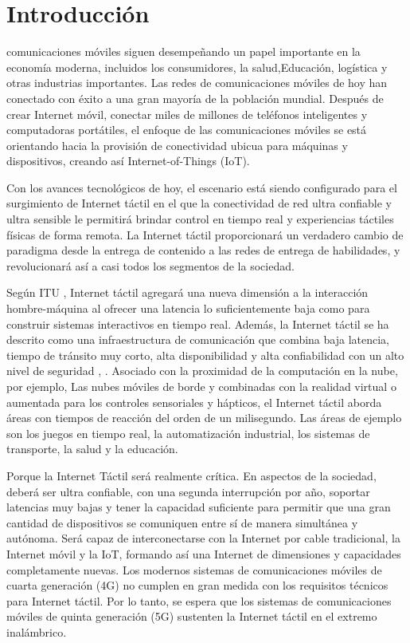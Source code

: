 \documentclass[12pt,journal,compsoc]{IEEEtran}
\begin{document}
\section{Introducción}

 comunicaciones móviles siguen desempeñando un papel importante en la economía moderna, incluidos los consumidores, la salud,Educación, logística y otras industrias importantes. Las redes de comunicaciones móviles de hoy han conectado con éxito a una gran mayoría de la población mundial. Después de crear Internet móvil, conectar miles de millones de teléfonos inteligentes y computadoras portátiles, el enfoque de las comunicaciones móviles se está orientando hacia la provisión de conectividad ubicua para máquinas y dispositivos, creando así Internet-of-Things (IoT).\cite{1}

Con los avances tecnológicos de hoy, el escenario está siendo configurado para el surgimiento de Internet táctil en el que la conectividad de red ultra confiable y ultra sensible le permitirá brindar control en tiempo real y experiencias táctiles físicas de forma remota. La Internet táctil proporcionará un verdadero cambio de paradigma desde la entrega de contenido a las redes de entrega de habilidades, y revolucionará así a casi todos los segmentos de la sociedad. 

Según ITU \cite{2}, Internet táctil agregará una nueva dimensión a la interacción hombre-máquina al ofrecer una latencia lo suficientemente baja como para construir sistemas interactivos en tiempo real. Además, la Internet táctil se ha descrito como una infraestructura de comunicación que combina baja latencia, tiempo de tránsito muy corto, alta disponibilidad y alta confiabilidad con un alto nivel de seguridad \cite{3}, \cite{4}. Asociado con la proximidad de la computación en la nube, por ejemplo, Las nubes móviles de borde y combinadas con la realidad virtual o aumentada para los controles sensoriales y hápticos, el Internet táctil aborda áreas con tiempos de reacción del orden de un milisegundo. Las áreas de ejemplo son los juegos en tiempo real, la automatización industrial, los sistemas de transporte, la salud y la educación.

Porque la Internet Táctil será realmente crítica. En aspectos de la sociedad, deberá ser ultra confiable, con una segunda interrupción por año, soportar latencias muy bajas y tener la capacidad suficiente para permitir que una gran cantidad de dispositivos se comuniquen entre sí de manera simultánea y autónoma. Será capaz de interconectarse con la Internet por cable tradicional, la Internet móvil y la IoT, formando así una Internet de dimensiones y capacidades completamente nuevas. Los modernos sistemas de comunicaciones móviles de cuarta generación (4G) no cumplen en gran medida con los requisitos técnicos para Internet táctil. Por lo tanto, se espera que los sistemas de comunicaciones móviles de quinta generación (5G) sustenten la Internet táctil en el extremo inalámbrico.
\end{document}
